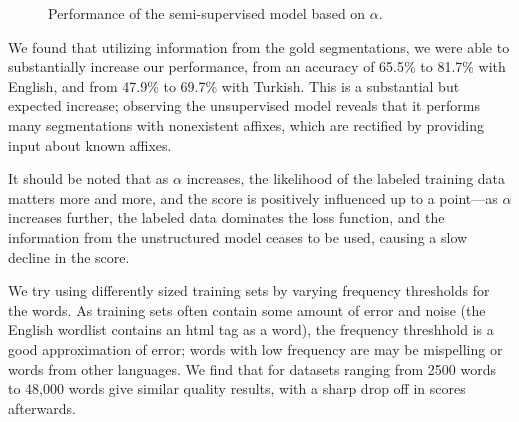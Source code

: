 \documentclass[11pt,twocolumn]{article}
\begin{document}
\begin{figure}
    \label{fig:supervised}
    \caption{Performance of the semi-supervised model based on $\alpha$.}
\end{figure}

We found that utilizing information from the gold segmentations, we were able to substantially increase our
performance, from an accuracy of 65.5\% to 81.7\% with English, and from 47.9\% to 69.7\% with Turkish.
This is a substantial but expected increase; observing the unsupervised model reveals that it performs
many segmentations with nonexistent affixes, which are rectified by providing input about known affixes.

It should be noted that as $\alpha$ increases, the likelihood of the labeled training data matters more and more,
and the score is positively influenced up to a point---as $\alpha$ increases further, the labeled data
dominates the loss function, and the information from the unstructured model ceases to be used,
causing a slow decline in the score.

We try using differently sized training sets by varying frequency thresholds for the words.
As training sets often contain some amount of error and noise (the English wordlist
contains an html tag as a word), the frequency threshhold is a good approximation
of error; words with low frequency are may be mispelling or words from other languages.
We find that for datasets ranging from 2500 words to 48,000 words give similar quality results,
with a sharp drop off in scores afterwards.
\end{document}
